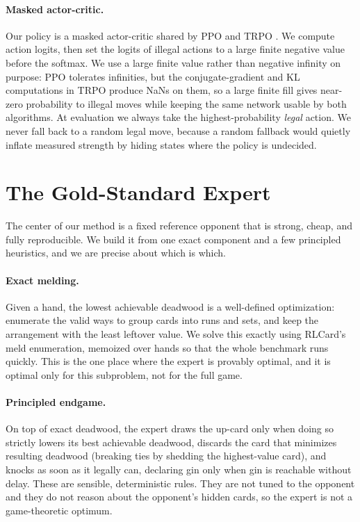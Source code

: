 \documentclass[letterpaper]{article} %
\begin{document}
\paragraph{Masked actor-critic.}
Our policy is a masked actor-critic shared by PPO and TRPO \citep{ppo,trpo}. We
compute action logits, then set the logits of illegal actions to a large finite
negative value before the softmax. We use a large finite value rather than
negative infinity on purpose: PPO tolerates infinities, but the
conjugate-gradient and KL computations in TRPO produce NaNs on them, so a large
finite fill gives near-zero probability to illegal moves while keeping the same
network usable by both algorithms. At evaluation we always take the
highest-probability \emph{legal} action. We never fall back to a random legal
move, because a random fallback would quietly inflate measured strength by
hiding states where the policy is undecided.

\section{The Gold-Standard Expert}
The center of our method is a fixed reference opponent that is strong, cheap,
and fully reproducible. We build it from one exact component and a few
principled heuristics, and we are precise about which is which.

\paragraph{Exact melding.}
Given a hand, the lowest achievable deadwood is a well-defined optimization:
enumerate the valid ways to group cards into runs and sets, and keep the
arrangement with the least leftover value. We solve this exactly using RLCard's
meld enumeration, memoized over hands so that the whole benchmark runs quickly.
This is the one place where the expert is provably optimal, and it is optimal
only for this subproblem, not for the full game.

\paragraph{Principled endgame.}
On top of exact deadwood, the expert draws the up-card only when doing so
strictly lowers its best achievable deadwood, discards the card that minimizes
resulting deadwood (breaking ties by shedding the highest-value card), and
knocks as soon as it legally can, declaring gin only when gin is reachable
without delay. These are sensible, deterministic rules. They are not tuned to
the opponent and they do not reason about the opponent's hidden cards, so the
expert is not a game-theoretic optimum.
\end{document}
